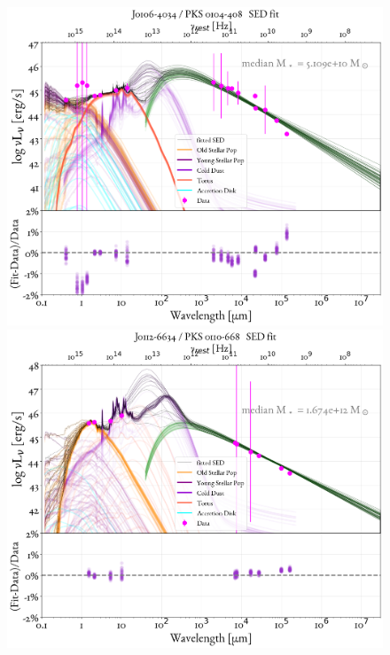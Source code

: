 \begin{figure}
    \centering
    \includegraphics[width=0.85\linewidth]{figures/ResultFits/5_SEDfit_145.png}\\
    \includegraphics[width=0.85\linewidth]{figures/ResultFits/6_SEDfit_162.png}    
\end{figure}
